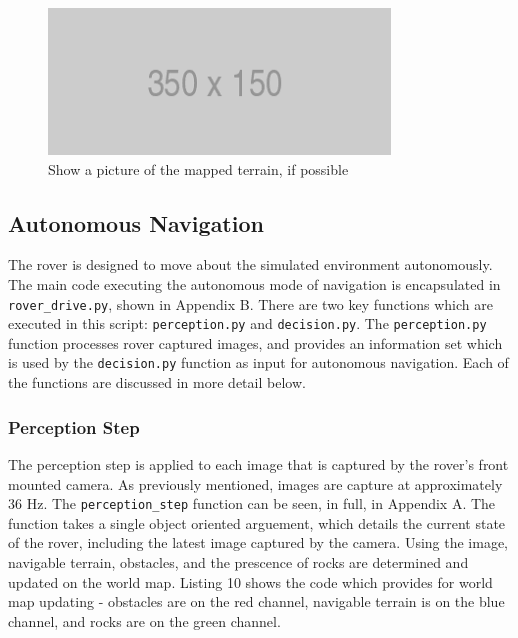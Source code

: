 \documentclass[a4paper]{article}
\begin{document}
\begin{figure}[h]
\centering
\includegraphics[scale=0.5]{placeholder}
\caption{Show a picture of the mapped terrain, if possible}
\end{figure}

\newpage

\subsection{Autonomous Navigation}
The rover is designed to move about the simulated environment autonomously. The main code executing the autonomous mode of navigation is encapsulated in \verb|rover_drive.py|, shown in Appendix B. There are two key functions which are executed in this script: \verb|perception.py| and \verb|decision.py|. The \verb|perception.py| function processes rover captured images, and provides an information set which is used by the \verb|decision.py| function as input for autonomous navigation. Each of the functions are discussed in more detail below.

\subsubsection{Perception Step}
The perception step is applied to each image that is captured by the rover's front mounted camera. As previously mentioned, images are capture at approximately 36 $\si{\hertz}$. The \verb|perception_step| function can be seen, in full, in Appendix A. The function takes a single object oriented arguement, which details the current state of the rover, including the latest image captured by the camera. Using the image, navigable terrain, obstacles, and the prescence of rocks are determined and updated on the world map. Listing 10 shows the code which provides for world map updating - obstacles are on the red channel, navigable terrain is on the blue channel, and rocks are on the green channel.
\end{document}
